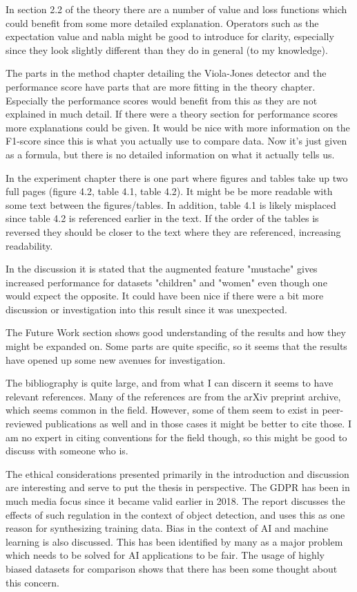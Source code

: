 \documentclass[11pt,a4paper]{article}
\begin{document}
	In section 2.2 of the theory there are a number of value and loss functions which could benefit from some more detailed explanation. Operators such as the expectation value and nabla might be good to introduce for clarity, especially since they look slightly different than they do in general (to my knowledge).
	
	The parts in the method chapter detailing the Viola-Jones detector and the performance score have parts that are more fitting in the theory chapter. Especially the performance scores would benefit from this as they are not explained in much detail. If there were a theory section for performance scores more explanations could be given. It would be nice with more information on the F1-score since this is what you actually use to compare data. Now it’s just given as a formula, but there is no detailed information on what it actually tells us.
	
	In the experiment chapter there is one part where figures and tables take up two full pages (figure 4.2, table 4.1, table 4.2). It might be be more readable with some text between the figures/tables. In addition, table 4.1 is likely misplaced since table 4.2 is referenced earlier in the text. If the order of the tables is reversed they should be closer to the text where they are referenced, increasing readability.
	
	In the discussion it is stated that the augmented feature "mustache" gives increased performance for datasets "children" and "women" even though one would expect the opposite. It could have been nice if there were a bit more discussion or investigation into this result since it was unexpected.
	
	The Future Work section shows good understanding of the results and how they might be expanded on. Some parts are quite specific, so it seems that the results have opened up some new avenues for investigation.
	
	The bibliography is quite large, and from what I can discern it seems to have relevant references. Many of the references are from the arXiv preprint archive, which seems common in the field. However, some of them seem to exist in peer-reviewed publications as well and in those cases it might be better to cite those. I am no expert in citing conventions for the field though, so this might be good to discuss with someone who is.
	
	The ethical considerations presented primarily in the introduction and discussion are interesting and serve to put the thesis in perspective. The GDPR has been in much media focus since it became valid earlier in 2018. The report discusses the effects of such regulation in the context of object detection, and uses this as one reason for synthesizing training data. Bias in the context of AI and machine learning is also discussed. This has been identified by many as a major problem which needs to be solved for AI applications to be fair. The usage of highly biased datasets for comparison shows that there has been some thought about this concern.
	
\end{document}
